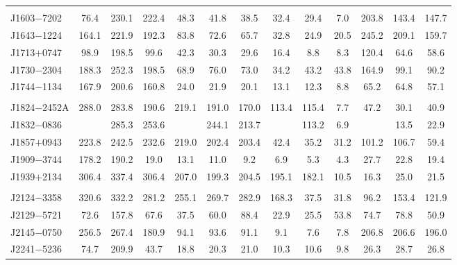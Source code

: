 \documentclass[useAMS,usenatbib]{mn2e}
\begin{document}
\begin{table}
\begin{center}
\begin{tabular}{lcccccccccccc}
	               &       &        &         &             &        &        &       &       &         &         &         &         \\     
J1603$-$7202     & 76.4  &  230.1 &  222.4  &   48.3      & 41.8   & 38.5   & 32.4  & 29.4  & 7.0     &  203.8  &  143.4  & 147.7   \\
J1643$-$1224     & 164.1 &  221.9 &  192.3  &   83.8      & 72.6   & 65.7   & 32.8  & 24.9  & 20.5    &  245.2  &  209.1  & 159.7   \\
J1713$+$0747     & 98.9  &  198.5 &  99.6   &   42.3      & 30.3   & 29.6   & 16.4  & 8.8   & 8.3     &  120.4  &  64.6   & 58.6    \\
J1730$-$2304     & 188.3 &  252.3 &  198.5  &   68.9      & 76.0   & 73.0   & 34.2  & 43.2  & 43.8    &  164.9  &  99.1   & 90.2    \\
J1744$-$1134     & 167.9 &  200.6 &  160.8  &   24.0      & 21.9   & 20.1   & 13.1  & 12.3  & 8.8     &  65.2   &  64.8   & 57.1    \\
	               &       &        &         &             &        &        &       &       &         &         &         &         \\     
J1824$-$2452A    & 288.0 &  283.8 &  190.6  &   219.1     & 191.0  & 170.0  & 113.4 &115.4  &7.7      &  47.2   &  30.1   & 40.9    \\
J1832$-$0836     &       &  285.3 &  253.6  &             & 244.1  & 213.7  &       & 113.2 &  6.9    &         &  13.5   & 22.9    \\
J1857$+$0943     & 223.8 &  242.5 &  232.6  &   219.0     & 202.4  & 203.4  & 42.4  & 35.2  & 31.2    &  101.2  &  106.7  & 59.4    \\
J1909$-$3744     & 178.2 &  190.2 &  19.0   &   13.1      & 11.0   & 9.2    & 6.9   &  5.3  & 4.3     &  27.7   &  22.8   & 19.4    \\
J1939$+$2134     & 306.4 &  337.4 &  306.4  &   207.0     & 199.3  & 204.5  & 195.1 &182.1  & 10.5    &  16.3   &  25.0   & 21.5    \\
	               &       &        &         &             &        &        &       &       &         &         &         &         \\     
J2124$-$3358     & 320.6 &  332.2 &  281.2  &   255.1     & 269.7  & 282.9  & 168.3 & 37.5  & 31.8    &  96.2   &  153.4  & 121.9   \\
J2129$-$5721     & 72.6  &  157.8 &  67.6   &   37.5      & 60.0   & 88.4   & 22.9  & 25.5  & 53.8    &  74.7   &  78.8   & 50.9    \\
J2145$-$0750     & 256.5 &  267.4 &  180.9  &   94.1      & 93.6   & 91.1   & 9.1   & 7.6   & 7.8     &  206.8  &  206.6  & 196.0   \\
J2241$-$5236     & 74.7  &  209.9 &  43.7   &   18.8      & 20.3   & 21.0   & 10.3  & 10.6  & 9.8     &  26.3   &  28.7   & 26.8    \\
\hline
\end{tabular}
\end{center}
\end{table}
\end{document}

